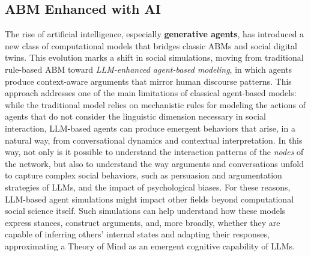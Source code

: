 \documentclass[11pt]{article}
\begin{document}
\subsection{ABM Enhanced with AI}
\label{subsec:2}
The rise of artificial intelligence, especially \textbf{generative agents}, has introduced a new class of computational models that bridges classic ABMs and social digital twins. 
This evolution marks a shift in social simulations, moving from traditional rule-based ABM toward \textit{LLM-enhanced agent-based modeling}, in which agents produce context-aware arguments that mirror human discourse patterns.
This approach addresses one of the main limitations of classical agent-based models: while the traditional model relies on mechanistic rules for modeling the actions of agents that do not consider the linguistic dimension necessary in social interaction, LLM-based agents can produce emergent behaviors that arise, in a natural way, from conversational dynamics and contextual interpretation. 
In this way, not only is it possible to understand the interaction patterns of the \textit{nodes} of the network, but also to understand the way arguments and conversations unfold to capture complex social behaviors, such as persuasion and argumentation strategies of LLMs, and the impact of psychological biases. 
For these reasons, LLM-based agent simulations might impact other fields beyond computational social science itself. 
Such simulations can help understand how these models express stances, construct arguments, and, more broadly, whether they are capable of inferring others' internal states and adapting their responses, approximating a Theory of Mind as an emergent cognitive capability of LLMs.
\end{document}
